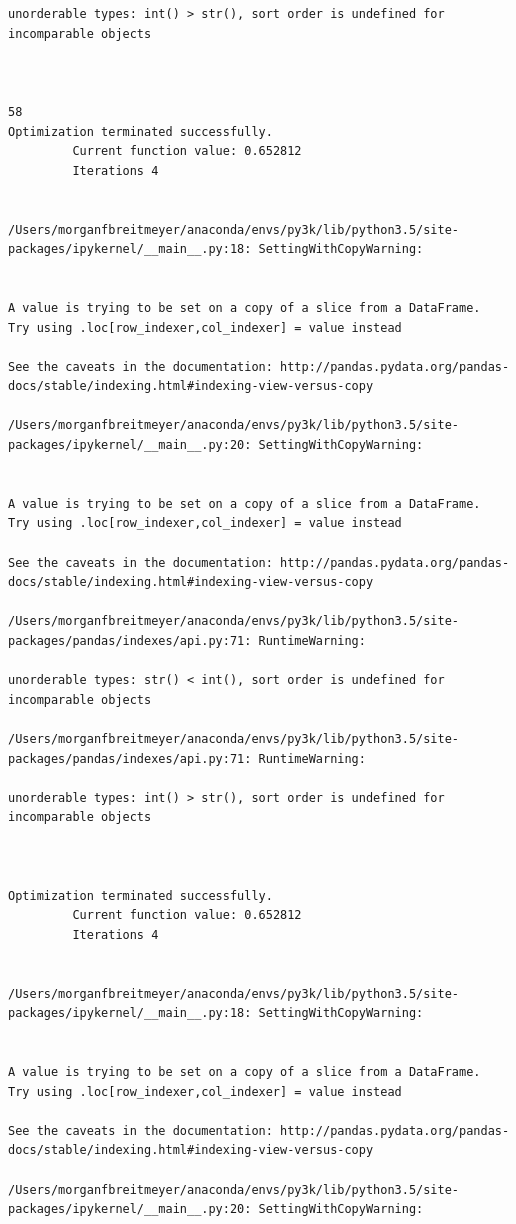 \begin{lstlisting}
unorderable types: int() > str(), sort order is undefined for incomparable objects



58
Optimization terminated successfully.
         Current function value: 0.652812
         Iterations 4


/Users/morganfbreitmeyer/anaconda/envs/py3k/lib/python3.5/site-packages/ipykernel/__main__.py:18: SettingWithCopyWarning:


A value is trying to be set on a copy of a slice from a DataFrame.
Try using .loc[row_indexer,col_indexer] = value instead

See the caveats in the documentation: http://pandas.pydata.org/pandas-docs/stable/indexing.html#indexing-view-versus-copy

/Users/morganfbreitmeyer/anaconda/envs/py3k/lib/python3.5/site-packages/ipykernel/__main__.py:20: SettingWithCopyWarning:


A value is trying to be set on a copy of a slice from a DataFrame.
Try using .loc[row_indexer,col_indexer] = value instead

See the caveats in the documentation: http://pandas.pydata.org/pandas-docs/stable/indexing.html#indexing-view-versus-copy

/Users/morganfbreitmeyer/anaconda/envs/py3k/lib/python3.5/site-packages/pandas/indexes/api.py:71: RuntimeWarning:

unorderable types: str() < int(), sort order is undefined for incomparable objects

/Users/morganfbreitmeyer/anaconda/envs/py3k/lib/python3.5/site-packages/pandas/indexes/api.py:71: RuntimeWarning:

unorderable types: int() > str(), sort order is undefined for incomparable objects



Optimization terminated successfully.
         Current function value: 0.652812
         Iterations 4


/Users/morganfbreitmeyer/anaconda/envs/py3k/lib/python3.5/site-packages/ipykernel/__main__.py:18: SettingWithCopyWarning:


A value is trying to be set on a copy of a slice from a DataFrame.
Try using .loc[row_indexer,col_indexer] = value instead

See the caveats in the documentation: http://pandas.pydata.org/pandas-docs/stable/indexing.html#indexing-view-versus-copy

/Users/morganfbreitmeyer/anaconda/envs/py3k/lib/python3.5/site-packages/ipykernel/__main__.py:20: SettingWithCopyWarning:



\end{lstlisting}
